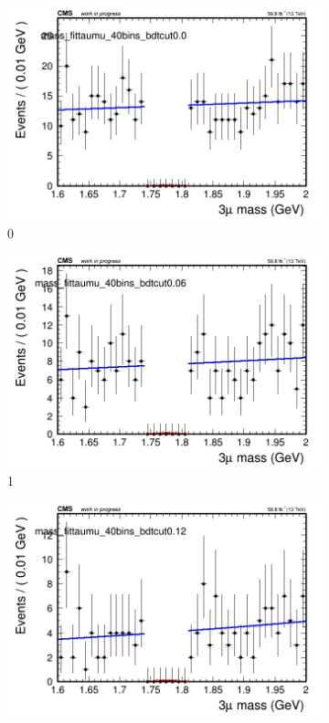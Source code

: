 \begin{figure}[h!]
    \centering
    \begin{subfigure}{0.2\textwidth}
        \includegraphics[width=\textwidth]{unfixed_exp/plots/taumu/massfit_taumu_40bins_bdtcut0.0.png}
        \caption{0}
    \end{subfigure}
    \begin{subfigure}{0.2\textwidth}
        \includegraphics[width=\textwidth]{unfixed_exp/plots/taumu/massfit_taumu_40bins_bdtcut0.06.png}
        \caption{1}
    \end{subfigure}
    \begin{subfigure}{0.2\textwidth}
        \includegraphics[width=\textwidth]{unfixed_exp/plots/taumu/massfit_taumu_40bins_bdtcut0.12.png}

\end{subfigure}
\end{figure}
